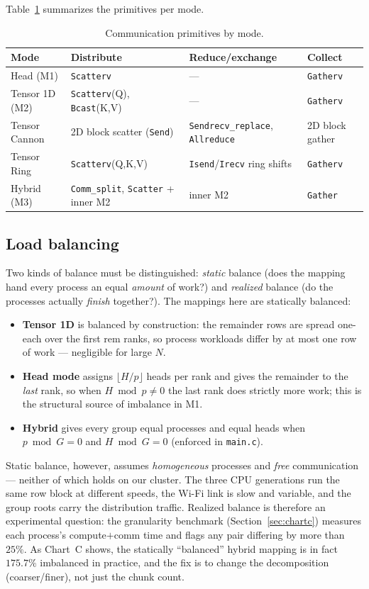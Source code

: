\documentclass[11pt,a4paper]{article}
\newcommand{\code}[1]{\texttt{#1}}
\begin{document}
\noindent
Table~\ref{tab:comm} summarizes the primitives per mode.
\begin{table}[H]
\centering\small
\caption{Communication primitives by mode.}\label{tab:comm}
\begin{tabular}{@{}llll@{}}
\toprule
Mode & Distribute & Reduce/exchange & Collect \\
\midrule
Head (M1)        & \code{Scatterv}                 & ---                                & \code{Gatherv} \\
Tensor 1D (M2)   & \code{Scatterv}(Q), \code{Bcast}(K,V) & ---                          & \code{Gatherv} \\
Tensor Cannon    & 2D block scatter (\code{Send})  & \code{Sendrecv\_replace}, \code{Allreduce} & 2D block gather \\
Tensor Ring      & \code{Scatterv}(Q,K,V)          & \code{Isend}/\code{Irecv} ring shifts & \code{Gatherv} \\
Hybrid (M3)      & \code{Comm\_split}, \code{Scatter} + inner M2 & inner M2          & \code{Gather} \\
\bottomrule
\end{tabular}
\end{table}

\subsection{Load balancing}
\label{sec:loadbal}
Two kinds of balance must be distinguished: \emph{static} balance (does the
mapping hand every process an equal \emph{amount} of work?) and \emph{realized}
balance (do the processes actually \emph{finish} together?). The mappings here are
statically balanced:
\begin{itemize}[leftmargin=1.4em]
\item \textbf{Tensor 1D} is balanced by construction: the remainder rows are
spread one-each over the first $\text{rem}$ ranks, so process workloads differ by
at most one row of work --- negligible for large $N$.
\item \textbf{Head mode} assigns $\lfloor H/p\rfloor$ heads per rank and gives
the remainder to the \emph{last} rank, so when $H\bmod p\neq 0$ the last rank does
strictly more work; this is the structural source of imbalance in M1.
\item \textbf{Hybrid} gives every group equal processes and equal heads when
$p\bmod G=0$ and $H\bmod G=0$ (enforced in \code{main.c}).
\end{itemize}
Static balance, however, assumes \emph{homogeneous} processes and \emph{free}
communication --- neither of which holds on our cluster. The three CPU generations
run the same row block at different speeds, the Wi-Fi link is slow and variable,
and the group roots carry the distribution traffic. Realized balance is therefore
an experimental question: the granularity benchmark (Section~\ref{sec:chartc})
measures each process's compute$+$comm time and flags any pair differing by more
than $25\%$. As Chart~C shows, the statically ``balanced'' hybrid mapping is in
fact $175.7\%$ imbalanced in practice, and the fix is to change the decomposition
(coarser/finer), not just the chunk count.
\end{document}
